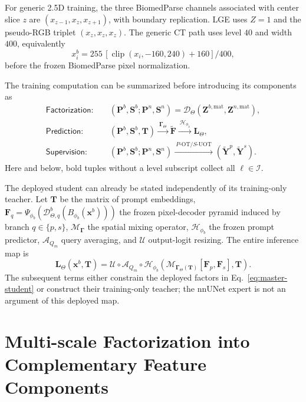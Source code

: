 \documentclass[10pt]{article}
\newcommand{\cI}{\mathcal{I}}
\newcommand{\clip}{\operatorname{clip}}
\begin{document}
For generic 2.5D training, the three BiomedParse channels associated with
center slice $z$ are $(x_{z-1},x_z,x_{z+1})$, with boundary replication.  LGE
uses $Z=1$ and the pseudo-RGB triplet $(x_z,x_z,x_z)$.  The generic CT path
uses level $40$ and width $400$, equivalently
\begin{equation}
    x_i^b=255\,[\clip(x_i,-160,240)+160]/400,
\end{equation}
before the frozen BiomedParse pixel normalization.

The training computation can be summarized before introducing its components as
\begin{equation}
\boxed{
\begin{aligned}
 \mathsf{Factorization}:\quad
 &(\bm P^b,\bm S^b;\bm P^n,\bm S^n)
 =\mathcal D_\Theta(\bm Z^{b,\mathrm{mat}},\bm Z^{n,\mathrm{mat}}),\\
 \mathsf{Prediction}:\quad
 &(\bm P^b,\bm S^b,\bm T)
 \xrightarrow{\ \bm\Gamma_\Theta\ }
 \widetilde{\bm F}
 \xrightarrow{\ \mathcal H_{\phi_b}\ }\bm L_\Theta,\\
 \mathsf{Supervision}:\quad
 &(\bm P^b,\bm S^b;\bm P^n,\bm S^n)
 \xrightarrow{\ P\text{-OT}/S\text{-UOT}\ }
 (\widetilde{\bm Y}^{p},\widetilde{\bm Y}^{s}).
\end{aligned}}
\label{eq:master-flow}
\end{equation}
Here and below, bold tuples without a level subscript collect all
$\ell\in\cI$.

The deployed student can already be stated independently of its training-only
teacher.  Let $\bm T$ be the matrix of prompt embeddings,
$\bm F_q=\Psi_{\phi_b}(\mathcal D^b_{\Theta,q}(B_{\phi_b}(\bm x^b)))$ the
frozen pixel-decoder pyramid induced by branch $q\in\{p,s\}$,
$\mathcal M_{\bm\Gamma}$ the spatial mixing operator, $\mathcal H_{\phi_b}$
the frozen prompt predictor, $\mathcal A_{Q_m}$ query averaging, and
$\mathcal U$ output-logit resizing.  The entire inference map is
\begin{equation}
\boxed{
 \bm L_\Theta(\bm x^b,\bm T)
 =\mathcal U\circ\mathcal A_{Q_m}\circ\mathcal H_{\phi_b}
 \left(
   \mathcal M_{\bm\Gamma_\Theta(\bm T)}[\bm F_p,\bm F_s],\bm T
 \right).}
\label{eq:master-student}
\end{equation}
The subsequent terms either constrain the deployed factors in
Eq.~\eqref{eq:master-student} or construct their training-only teacher; the
nnUNet expert is not an argument of this deployed map.

\section{Multi-scale Factorization into Complementary Feature Components}
\end{document}
